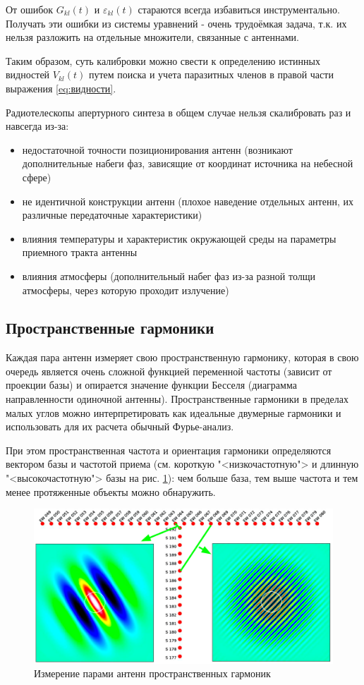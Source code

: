 От ошибок $G_{kl}(t)$ и $\varepsilon_{kl}(t)$ стараются всегда избавиться инструментально. Получать эти ошибки из системы уравнений - очень трудоёмкая задача, т.к. их нельзя разложить на отдельные множители, связанные с антеннами.

Таким образом, суть калибровки можно свести к определению истинных видностей $V_{kl}(t)$ путем поиска и учета паразитных членов в правой части выражения \eqref{eq:видности}.

Радиотелескопы апертурного синтеза в общем случае нельзя скалибровать раз и навсегда из-за:
\begin{itemize}
	\item недостаточной точности позиционирования антенн (возникают	дополнительные набеги фаз, зависящие от координат источника на небесной сфере)
	\item не идентичной конструкции антенн (плохое наведение отдельных антенн, их различные передаточные характеристики)
	\item влияния температуры и характеристик окружающей среды на параметры приемного тракта антенны
	\item влияния атмосферы (дополнительный набег фаз из-за разной толщи атмосферы, через которую проходит излучение)
\end{itemize}

\subsection{Пространственные гармоники}
Каждая пара антенн измеряет свою пространственную гармонику, которая в свою очередь является очень сложной функцией переменной частоты (зависит от проекции базы) и опирается значение функции Бесселя (диаграмма направленности одиночной антенны). Пространственные гармоники в пределах малых углов можно интерпретировать как идеальные двумерные гармоники и использовать для их расчета обычный Фурье-анализ.

При этом пространственная частота и ориентация гармоники определяются вектором базы и частотой приема (см. короткую "<низкочастотную"> и длинную "<высокочастотную"> базы на рис. \ref{fig:гармоники}): чем больше база, тем выше частота и тем менее протяженные объекты можно обнаружить.

\begin{figure}[H]
	\centering
	\includegraphics[scale=0.43]{images/globa1.png}
	\caption{Измерение парами антенн пространственных гармоник}
	\label{fig:гармоники}
\end{figure}

